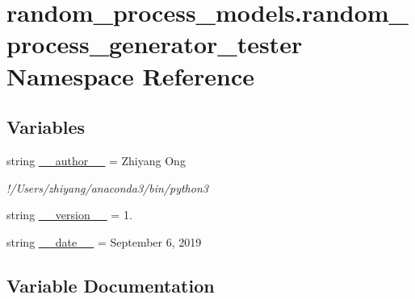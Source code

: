 \hypertarget{namespacerandom__process__models_1_1random__process__generator__tester}{}\section{random\+\_\+process\+\_\+models.\+random\+\_\+process\+\_\+generator\+\_\+tester Namespace Reference}
\label{namespacerandom__process__models_1_1random__process__generator__tester}
\subsection*{Variables}
\begin{DoxyCompactItemize}
\item 
string \hyperlink{namespacerandom__process__models_1_1random__process__generator__tester_a533d9611b280d2c9d3154e7ddea602f0}{\+\_\+\+\_\+author\+\_\+\+\_\+} = \textquotesingle{}Zhiyang Ong\textquotesingle{}
\begin{DoxyCompactList}\small\item\em !/\+Users/zhiyang/anaconda3/bin/python3 \end{DoxyCompactList}\item 
string \hyperlink{namespacerandom__process__models_1_1random__process__generator__tester_a6d64c35578abb54108b6261a9a668bbe}{\+\_\+\+\_\+version\+\_\+\+\_\+} = \textquotesingle{}1.\textquotesingle{}
\item 
string \hyperlink{namespacerandom__process__models_1_1random__process__generator__tester_a0535cc1b4a76908d454a4480982fd703}{\+\_\+\+\_\+date\+\_\+\+\_\+} = \textquotesingle{}September 6, 2019\textquotesingle{}
\end{DoxyCompactItemize}


\subsection{Variable Documentation}
\hypertarget{namespacerandom__process__models_1_1random__process__generator__tester_a533d9611b280d2c9d3154e7ddea602f0}{}
